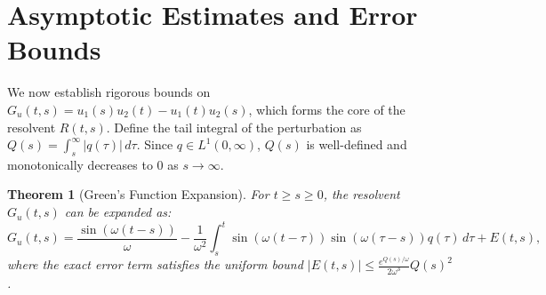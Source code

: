 \documentclass[10pt,reqno]{amsart}
\newtheorem{theorem}{Theorem}
\theoremstyle{definition}
\begin{document}
	\section{Asymptotic Estimates and Error Bounds}
	
	We now establish rigorous bounds on $G_u(t, s) = u_1(s)u_2(t) - u_1(t)u_2(s)$, which forms the core of the resolvent $R(t, s)$. Define the tail integral of the perturbation as $Q(s) = \int_s^\infty |q(\tau)| \, d\tau$. Since $q \in L^1(0, \infty)$, $Q(s)$ is well-defined and monotonically decreases to $0$ as $s \to \infty$.
	
	\begin{theorem}[Green's Function Expansion]
		For $t \ge s \ge 0$, the resolvent $G_u(t, s)$ can be expanded as:
		\[ G_u(t, s) = \frac{\sin(\omega(t-s))}{\omega} - \frac{1}{\omega^2} \int_s^t \sin(\omega(t-\tau)) \sin(\omega(\tau-s)) q(\tau) \, d\tau + E(t, s), \]
		where the exact error term satisfies the uniform bound $|E(t, s)| \le \frac{e^{Q(s)/\omega}}{2\omega^3} Q(s)^2$.
	\end{theorem}
	
\end{document}
